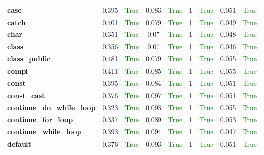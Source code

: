 \documentclass{article}
\begin{document}
\begin{xltabular}{\textwidth}{lcccccccc}
\textbf{{\fontsize{10}{12}\selectfont case}}& 0.395&\textcolor{green}{True}& 0.083&\textcolor{green}{True}& 1&\textcolor{green}{True}& 0.051&\textcolor{green}{True} \\[0.5ex]
\textbf{{\fontsize{10}{12}\selectfont catch}}& 0.401&\textcolor{green}{True}& 0.079&\textcolor{green}{True}& 1&\textcolor{green}{True}& 0.049&\textcolor{green}{True} \\[0.5ex]
\textbf{{\fontsize{10}{12}\selectfont char}}& 0.351&\textcolor{green}{True}& 0.07&\textcolor{green}{True}& 1&\textcolor{green}{True}& 0.048&\textcolor{green}{True} \\[0.5ex]
\textbf{{\fontsize{10}{12}\selectfont class}}& 0.356&\textcolor{green}{True}& 0.07&\textcolor{green}{True}& 1&\textcolor{green}{True}& 0.046&\textcolor{green}{True} \\[0.5ex]
\textbf{{\fontsize{10}{12}\selectfont class\_public}}& 0.481&\textcolor{green}{True}& 0.079&\textcolor{green}{True}& 1&\textcolor{green}{True}& 0.055&\textcolor{green}{True} \\[0.5ex]
\textbf{{\fontsize{10}{12}\selectfont compl}}& 0.411&\textcolor{green}{True}& 0.085&\textcolor{green}{True}& 1&\textcolor{green}{True}& 0.055&\textcolor{green}{True} \\[0.5ex]
\textbf{{\fontsize{10}{12}\selectfont const}}& 0.395&\textcolor{green}{True}& 0.084&\textcolor{green}{True}& 1&\textcolor{green}{True}& 0.051&\textcolor{green}{True} \\[0.5ex]
\textbf{{\fontsize{10}{12}\selectfont const\_cast}}& 0.376&\textcolor{green}{True}& 0.097&\textcolor{green}{True}& 1&\textcolor{green}{True}& 0.051&\textcolor{green}{True} \\[0.5ex]
\textbf{{\fontsize{10}{12}\selectfont continue\_do\_while\_loop}}& 0.323&\textcolor{green}{True}& 0.093&\textcolor{green}{True}& 1&\textcolor{green}{True}& 0.055&\textcolor{green}{True} \\[0.5ex]
\textbf{{\fontsize{10}{12}\selectfont continue\_for\_loop}}& 0.337&\textcolor{green}{True}& 0.089&\textcolor{green}{True}& 1&\textcolor{green}{True}& 0.053&\textcolor{green}{True} \\[0.5ex]
\textbf{{\fontsize{10}{12}\selectfont continue\_while\_loop}}& 0.393&\textcolor{green}{True}& 0.094&\textcolor{green}{True}& 1&\textcolor{green}{True}& 0.047&\textcolor{green}{True} \\[0.5ex]
\textbf{{\fontsize{10}{12}\selectfont default}}& 0.376&\textcolor{green}{True}& 0.093&\textcolor{green}{True}& 1&\textcolor{green}{True}& 0.051&\textcolor{green}{True} \\[0.5ex]

\end{xltabular}
\end{document}
